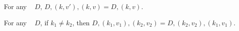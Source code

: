 
\begin{theorem}
\label{thm:cont-dicts}

\breakAndIndent
%
For any {\dd}~ $D$,
%
$D, (k, v'), (k, v) = D, (k, v)$.

\end{theorem}

\begin{theorem}
\label{thm:exch-dicts}

\breakAndIndent
%
For any {\dd}~ $D$,
%
if $k_1 \ne k_2$, then
%
$D, (k_1, v_1), (k_2, v_2) = D, (k_2, v_2), (k_1, v_1)$.

\end{theorem}
